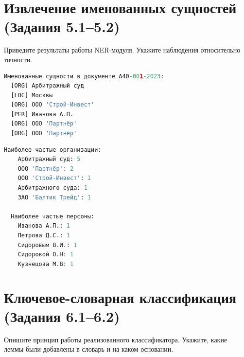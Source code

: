 \documentclass[12pt, a4paper]{report}
\newcommand{\placeholder}[2][Вставьте результат]{%
  \begin{tcolorbox}[placeholderbox, title={#2}]
    #1
  \end{tcolorbox}%
  \vspace{4pt}%
}
\begin{document}
\section{Извлечение именованных сущностей (Задания 5.1–5.2)}

Приведите результаты работы NER-модуля. Укажите наблюдения относительно точности.

\begin{lstlisting}[language=Python, caption={Именованные сущности в выбранном документе}]
  Именованные сущности в документе A40-001-2023:
  [ORG] Арбитражный суд
  [LOC] Москвы
  [ORG] ООО 'Строй-Инвест'
  [PER] Иванова А.П.
  [ORG] ООО 'Партнёр'
  [ORG] ООО 'Партнёр'
\end{lstlisting}


\begin{lstlisting}[language=Python, caption={Сводная таблица именованных сущностей}]
  Наиболее частые организации:
    Арбитражный суд: 5
    ООО 'Партнёр': 2
    ООО 'Строй-Инвест': 1
    Арбитражного суда: 1
    ЗАО 'Балтик Трейд': 1

  Наиболее частые персоны:
    Иванова А.П.: 1
    Петрова Д.С.: 1
    Сидоровым В.И.: 1
    Сидоровой О.Н: 1
    Кузнецова М.В: 1
\end{lstlisting}


\section{Ключевое-словарная классификация (Задания 6.1–6.2)}

Опишите принцип работы реализованного классификатора. Укажите, какие леммы были
добавлены в словарь и на каком основании.

\end{document}
